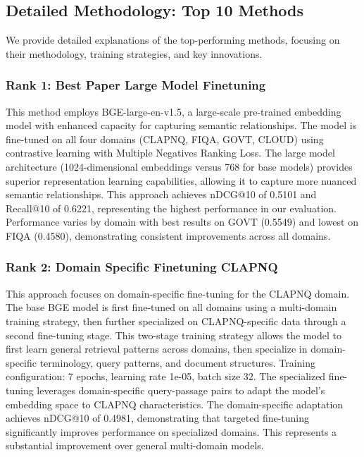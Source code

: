 \documentclass[conference]{IEEEtran}
\begin{document}
\subsection{Detailed Methodology: Top 10 Methods}

We provide detailed explanations of the top-performing methods, focusing on their methodology, training strategies, and key innovations.

\subsubsection{Rank 1: Best Paper Large Model Finetuning}

This method employs BGE-large-en-v1.5, a large-scale pre-trained embedding model with enhanced capacity for capturing semantic relationships. The model is fine-tuned on all four domains (CLAPNQ, FIQA, GOVT, CLOUD) using contrastive learning with Multiple Negatives Ranking Loss. The large model architecture (1024-dimensional embeddings versus 768 for base models) provides superior representation learning capabilities, allowing it to capture more nuanced semantic relationships. This approach achieves nDCG@10 of 0.5101 and Recall@10 of 0.6221, representing the highest performance in our evaluation. Performance varies by domain with best results on GOVT (0.5549) and lowest on FIQA (0.4580), demonstrating consistent improvements across all domains. 

\subsubsection{Rank 2: Domain Specific Finetuning CLAPNQ}

This approach focuses on domain-specific fine-tuning for the CLAPNQ domain. The base BGE model is first fine-tuned on all domains using a multi-domain training strategy, then further specialized on CLAPNQ-specific data through a second fine-tuning stage. This two-stage training strategy allows the model to first learn general retrieval patterns across domains, then specialize in domain-specific terminology, query patterns, and document structures. Training configuration: 7 epochs, learning rate 1e-05, batch size 32. The specialized fine-tuning leverages domain-specific query-passage pairs to adapt the model's embedding space to CLAPNQ characteristics. The domain-specific adaptation achieves nDCG@10 of 0.4981, demonstrating that targeted fine-tuning significantly improves performance on specialized domains. This represents a substantial improvement over general multi-domain models. 
\end{document}
